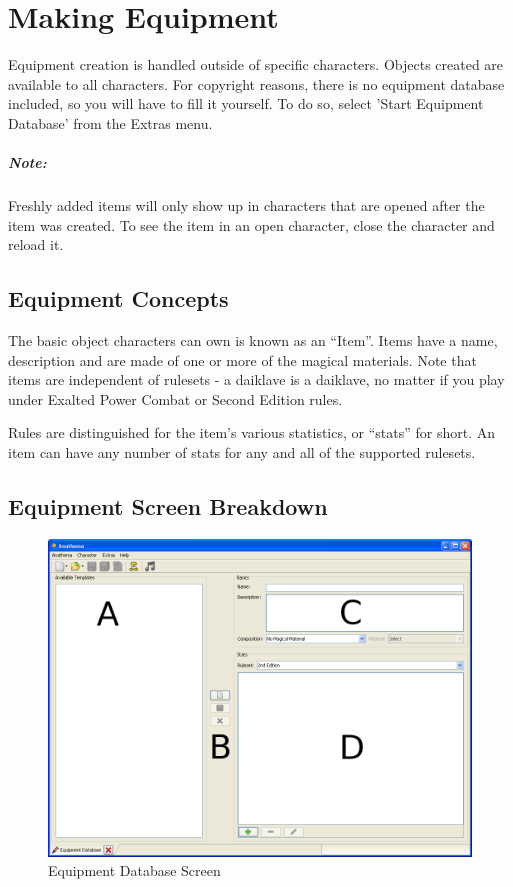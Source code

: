 \chapter{Making Equipment}
Equipment creation is handled outside of specific characters. Objects created are available to all characters. For copyright reasons, there is no equipment database included, so you will have to fill it yourself.  To do so, select 'Start Equipment Database' from the Extras menu.

\paragraph{Note:} Freshly added items will only show up in characters that are opened after the item was created. To see the item in an open character, close the character and reload it.

\section{Equipment Concepts}
The basic object characters can own is known as an "`Item"'. Items have a name, description and are made of one or more of the magical materials. Note that items are independent of rulesets - a daiklave is a daiklave, no matter if you play under Exalted Power Combat or Second Edition rules.

Rules are distinguished for the item's various statistics, or "`stats"' for short. An item can have any number of stats for any and all of the supported rulesets. 

\section{Equipment Screen Breakdown}
\begin{figure}
	\centering
		\includegraphics[width=1.00\textwidth]{images/Equipment.png}
	\caption{Equipment Database Screen}
	\label{fig:Equipment}
\end{figure}


